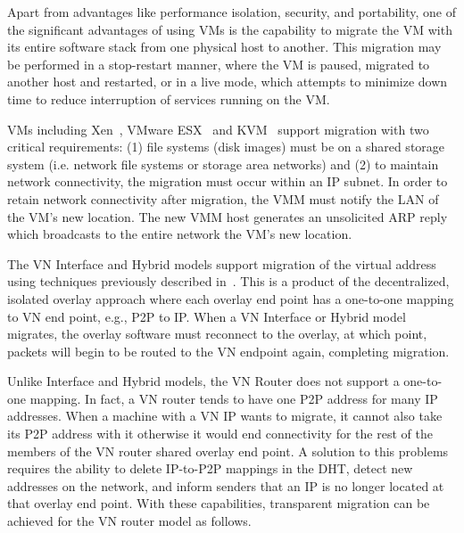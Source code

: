 Apart from advantages like performance isolation, security, and portability,
one of the significant advantages of using VMs is the capability to migrate the
VM with its entire software stack from one physical host to another.  This
migration may be performed in a stop-restart manner, where the VM is paused,
migrated to another host and restarted, or in a live mode, which attempts to
minimize down time to reduce interruption of services running on the VM.

VMs including Xen~\cite{xen-live}, VMware ESX~\cite{vmotion} and KVM~\cite{kvm}
support migration with two critical requirements: (1) file systems (disk
images) must be on a shared storage system (i.e. network file systems or
storage area networks) and (2) to maintain network connectivity, the migration
must occur within an IP subnet.  In order to retain network connectivity after
migration, the VMM must notify the LAN of the VM's new location.  The new VMM
host generates an unsolicited ARP reply which broadcasts to the entire network
the VM's new location.  

The VN Interface and Hybrid models support migration of the virtual address
using techniques previously described in~\cite{ipop}.  This is a product of the
decentralized, isolated overlay approach where each overlay end point has a
one-to-one mapping to VN end point, e.g., P2P to IP.  When a VN Interface or
Hybrid model migrates, the overlay software must reconnect to the overlay, at
which point, packets will begin to be routed to the VN endpoint again,
completing migration.

Unlike Interface and Hybrid models, the VN Router does not support a one-to-one
mapping.  In fact, a VN router tends to have one P2P address for many IP
addresses.  When a machine with a VN IP wants to migrate, it cannot also take
its P2P address with it otherwise it would end connectivity for the rest of the
members of the VN router shared  overlay end point.  A solution to this
problems requires the ability to delete IP-to-P2P mappings in the DHT, detect
new addresses on the network, and inform senders that an IP is no longer
located at that overlay end point.  With these capabilities, transparent
migration can be achieved for the VN router model as follows. 

